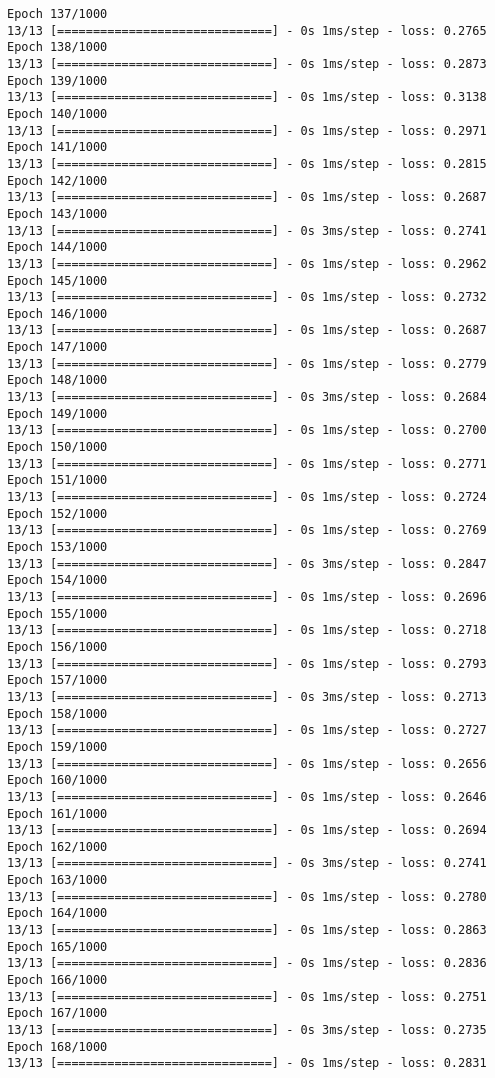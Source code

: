 \documentclass[11pt]{article}
\begin{document}
\begin{Verbatim}[commandchars=\\\{\}]
Epoch 137/1000
13/13 [==============================] - 0s 1ms/step - loss: 0.2765
Epoch 138/1000
13/13 [==============================] - 0s 1ms/step - loss: 0.2873
Epoch 139/1000
13/13 [==============================] - 0s 1ms/step - loss: 0.3138
Epoch 140/1000
13/13 [==============================] - 0s 1ms/step - loss: 0.2971
Epoch 141/1000
13/13 [==============================] - 0s 1ms/step - loss: 0.2815
Epoch 142/1000
13/13 [==============================] - 0s 1ms/step - loss: 0.2687
Epoch 143/1000
13/13 [==============================] - 0s 3ms/step - loss: 0.2741
Epoch 144/1000
13/13 [==============================] - 0s 1ms/step - loss: 0.2962
Epoch 145/1000
13/13 [==============================] - 0s 1ms/step - loss: 0.2732
Epoch 146/1000
13/13 [==============================] - 0s 1ms/step - loss: 0.2687
Epoch 147/1000
13/13 [==============================] - 0s 1ms/step - loss: 0.2779
Epoch 148/1000
13/13 [==============================] - 0s 3ms/step - loss: 0.2684
Epoch 149/1000
13/13 [==============================] - 0s 1ms/step - loss: 0.2700
Epoch 150/1000
13/13 [==============================] - 0s 1ms/step - loss: 0.2771
Epoch 151/1000
13/13 [==============================] - 0s 1ms/step - loss: 0.2724
Epoch 152/1000
13/13 [==============================] - 0s 1ms/step - loss: 0.2769
Epoch 153/1000
13/13 [==============================] - 0s 3ms/step - loss: 0.2847
Epoch 154/1000
13/13 [==============================] - 0s 1ms/step - loss: 0.2696
Epoch 155/1000
13/13 [==============================] - 0s 1ms/step - loss: 0.2718
Epoch 156/1000
13/13 [==============================] - 0s 1ms/step - loss: 0.2793
Epoch 157/1000
13/13 [==============================] - 0s 3ms/step - loss: 0.2713
Epoch 158/1000
13/13 [==============================] - 0s 1ms/step - loss: 0.2727
Epoch 159/1000
13/13 [==============================] - 0s 1ms/step - loss: 0.2656
Epoch 160/1000
13/13 [==============================] - 0s 1ms/step - loss: 0.2646
Epoch 161/1000
13/13 [==============================] - 0s 1ms/step - loss: 0.2694
Epoch 162/1000
13/13 [==============================] - 0s 3ms/step - loss: 0.2741
Epoch 163/1000
13/13 [==============================] - 0s 1ms/step - loss: 0.2780
Epoch 164/1000
13/13 [==============================] - 0s 1ms/step - loss: 0.2863
Epoch 165/1000
13/13 [==============================] - 0s 1ms/step - loss: 0.2836
Epoch 166/1000
13/13 [==============================] - 0s 1ms/step - loss: 0.2751
Epoch 167/1000
13/13 [==============================] - 0s 3ms/step - loss: 0.2735
Epoch 168/1000
13/13 [==============================] - 0s 1ms/step - loss: 0.2831

\end{Verbatim}
\end{document}
